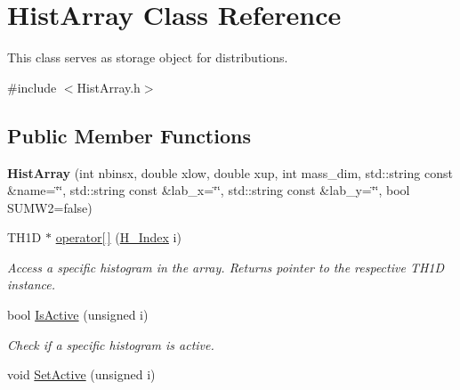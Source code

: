 \hypertarget{classHistArray}{}\section{Hist\+Array Class Reference}
\label{classHistArray}


This class serves as storage object for distributions.  




{\ttfamily \#include $<$Hist\+Array.\+h$>$}

\subsection*{Public Member Functions}
\begin{DoxyCompactItemize}
\item 
\hypertarget{classHistArray_a0458829293fd8da3993d7bde7843e8f6}{}{\bfseries Hist\+Array} (int nbinsx, double xlow, double xup, int mass\+\_\+dim, std\+::string const \&name=\char`\"{}\char`\"{}, std\+::string const \&lab\+\_\+x=\char`\"{}\char`\"{}, std\+::string const \&lab\+\_\+y=\char`\"{}\char`\"{}, bool S\+U\+M\+W2=false)\label{classHistArray_a0458829293fd8da3993d7bde7843e8f6}

\item 
T\+H1\+D $\ast$ \hyperlink{classHistArray_a914db159343d33fdb5b2ccb9210792fa}{operator\mbox{[}$\,$\mbox{]}} (\hyperlink{HistArray_8h_abdf25c9f0ab78c4243f63cb2bacf26d9}{H\+\_\+\+Index} i)
\begin{DoxyCompactList}\small\item\em Access a specific histogram in the array. Returns pointer to the respective T\+H1\+D instance. \end{DoxyCompactList}\item 
\hypertarget{classHistArray_ab324fc243624240fe661ab18529f70c3}{}bool \hyperlink{classHistArray_ab324fc243624240fe661ab18529f70c3}{Is\+Active} (unsigned i)\label{classHistArray_ab324fc243624240fe661ab18529f70c3}

\begin{DoxyCompactList}\small\item\em Check if a specific histogram is active. \end{DoxyCompactList}\item 
\hypertarget{classHistArray_a5a83ba3fc0f0e30e41175d8a06bc24c3}{}void \hyperlink{classHistArray_a5a83ba3fc0f0e30e41175d8a06bc24c3}{Set\+Active} (unsigned i)\label{classHistArray_a5a83ba3fc0f0e30e41175d8a06bc24c3}


\end{DoxyCompactItemize}
